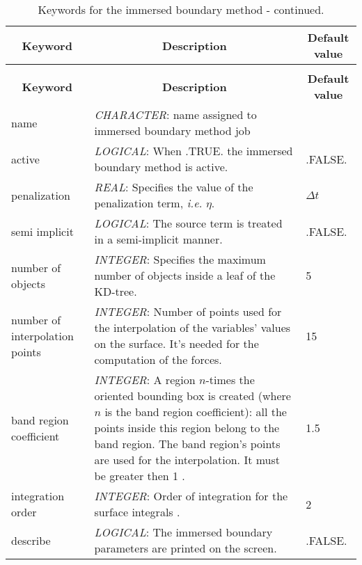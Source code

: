 \documentclass[a4paper,10pt]{report}
\begin{document}
\begin{longtable}{|p{4cm}|p{10cm}|p{2.2cm}|}
\caption{Keywords for the immersed boundary method.} \label{tab:IBMtab} \\
\hline
\multicolumn{1}{|c|}{\textbf{Keyword}} & \multicolumn{1}{c|}{\textbf{Description}} & \multicolumn{1}{c|}{\textbf{Default value}} \\ \hline
\endfirsthead

\caption{Keywords for the immersed boundary method - continued.} \\
\hline
\multicolumn{1}{|c|}{\textbf{Keyword}} & \multicolumn{1}{c|}{\textbf{Description}} & \multicolumn{1}{c|}{\textbf{Default value}} \\ \hline
\endhead

name & \textit{CHARACTER}: name assigned to immersed boundary method job &  \\ \hline

active & \textit{LOGICAL}: When .TRUE. the immersed boundary method is active. & .FALSE. \\ \hline

penalization & \textit{REAL}: Specifies the value of the penalization term, \textit{i.e.} $\eta$. & $\Delta t$ \\ \hline

semi implicit & \textit{LOGICAL}: The source term is treated in a semi-implicit manner. & .FALSE. \\ \hline


number of objects & \textit{INTEGER}: Specifies the maximum number of objects inside a leaf of the KD-tree. & 5 \\ \hline

number of interpolation points & \textit{INTEGER}: Number of points used for the interpolation of the variables' values on the surface. It's needed for the computation of the forces.  & 15 \\ \hline

band region coefficient  & \textit{INTEGER}: A region $n$-times the oriented bounding box is created (where $n$ is the band region coefficient): all the points inside this region belong to the band region. The band region's points are used for the interpolation. It must be greater then 1 . & 1.5 \\ \hline

integration order  & \textit{INTEGER}: Order of integration for the surface integrals .& 2 \\ \hline

describe & \textit{LOGICAL}: The immersed boundary parameters are printed on the screen. & .FALSE. \\ \hline



\end{longtable}
\end{document}
